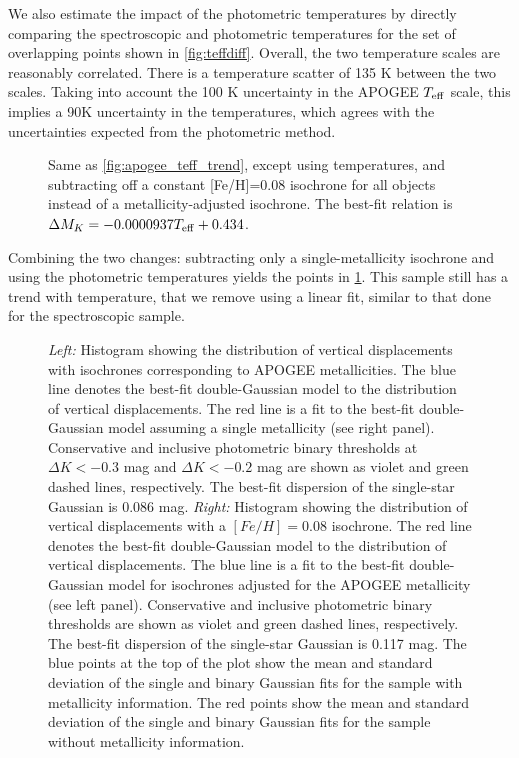 \documentclass[manuscript]{aastex6}
\newcommand{\Teff}{\ensuremath{T_{\rm eff}}}
\newcommand{\MK}{\ensuremath{M_K}}
\begin{document}
We also estimate the impact of the photometric temperatures by directly 
comparing the spectroscopic and photometric temperatures for the set of 
overlapping points shown in \cref{fig:teffdiff}. Overall, the two temperature scales are reasonably
correlated. There is a temperature scatter of 135 K between the two scales.
Taking into account the 100 K uncertainty in the APOGEE \Teff{} scale, this
implies a 90K uncertainty in the \citet{Pinsonneault12} temperatures, which
agrees with the uncertainties expected from the photometric method. 

\begin{figure}[htb]
    \centering
    \caption{Same as \cref{fig:apogee_teff_trend}, except using
        \citet{Pinsonneault12} temperatures, and subtracting off a
    constant [Fe/H]=0.08 isochrone for all objects instead of a 
    metallicity-adjusted isochrone. The best-fit relation is \(\Delta \MK{} =
-0.0000937 \Teff{} + 0.434\). }\label{fig:photuncor}
\end{figure}

Combining the two changes: subtracting only a single-metallicity isochrone and
using the photometric temperatures yields the points in \cref{fig:photuncor}.
This sample still has a trend with temperature, that we remove using a linear
fit, similar to that done for the spectroscopic sample.

\begin{figure*}[htb]
    \centering
    \caption{\emph{Left:} Histogram showing the distribution of vertical 
        displacements with isochrones corresponding to APOGEE metallicities.
        The blue line denotes the best-fit double-Gaussian model to the
        distribution of vertical displacements. The red line is a fit to the
        best-fit double-Gaussian model assuming a single metallicity (see right
        panel). Conservative and inclusive photometric binary thresholds at 
        \(\Delta K < -0.3\) mag and \(\Delta K < -0.2\) mag are shown as violet and green dashed 
        lines, respectively. The best-fit dispersion of the single-star 
        Gaussian is 0.086 mag. \emph{Right:} Histogram showing the 
        distribution of vertical displacements with a \([Fe/H] = 0.08\) 
        isochrone. The red line denotes the best-fit double-Gaussian model to
        the distribution of vertical displacements. The blue line is a fit to
        the best-fit double-Gaussian model for isochrones adjusted for the
        APOGEE metallicity (see left panel). Conservative and inclusive
        photometric binary thresholds are shown as violet and green dashed 
        lines, respectively. The best-fit dispersion of the single-star 
        Gaussian is 0.117 mag. The blue points at the top of the plot show the
    mean and standard deviation of the single and binary Gaussian fits for the
sample with metallicity information. The red points show the mean and standard
deviation of the single and binary Gaussian fits for the sample without
metallicity information.}\label{fig:histcompare}
\end{figure*}
\end{document}
